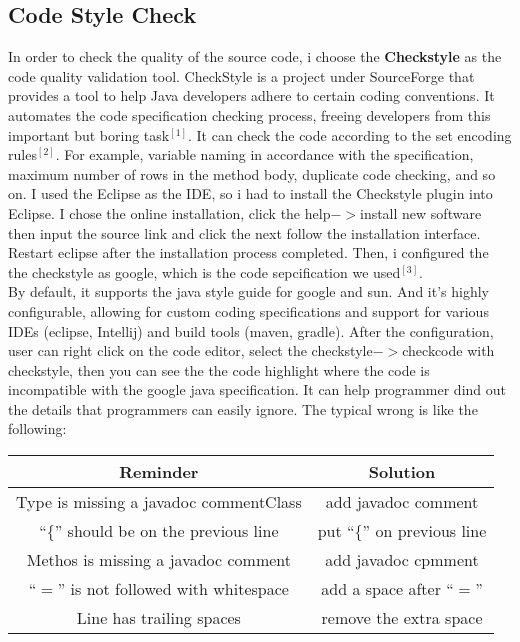 \documentclass[11pt]{report}
\begin{document}
\subsection*{Code Style Check}
In order to check the quality of the source code, i choose the \textbf{Checkstyle} as the code quality validation tool. CheckStyle is a project under SourceForge that provides a tool to help Java developers adhere to certain coding conventions. It automates the code specification checking process, freeing developers from this important but boring task$^{[1]}$. It can check the code according to the set encoding rules$^{[2]}$. For example, variable naming in accordance with the specification, maximum number of rows in the method body, duplicate code checking, and so on. I used the Eclipse as the IDE, so i had to install the Checkstyle plugin into Eclipse. I chose the online installation, click the help$->$install new software then input the source link and click the next follow the installation interface. Restart eclipse after the installation process completed. Then, i configured the the checkstyle as google, which is the code sepcification we used$^{[3]}$.\\
By default, it supports the java style guide for google and sun. And it's highly configurable, allowing for custom coding specifications and support for various IDEs (eclipse, Intellij) and build tools (maven, gradle). 
After the configuration, user can right click on the code editor, select the checkstyle$->$checkcode with checkstyle, then you can see the the code highlight where the code is incompatible with the google java specification. It can help programmer dind out the details that programmers can easily ignore. The typical wrong is like the following:
\begin{center}
    \begin{tabular}{|c|c|}
        \hline
        Reminder&Solution\\
        \hline
        Type is missing a javadoc commentClass&add javadoc comment\\
        \hline
        “\{” should be on the previous line&put “\{” on previous line\\
        \hline
        Methos is missing a javadoc comment&add javadoc cpmment\\
        \hline
        “$=$” is not followed with whitespace&add a space after “$=$”\\
        \hline
         Line has trailing spaces&remove the extra space\\
         \hline
    \end{tabular}
\end{center}
\end{document}
